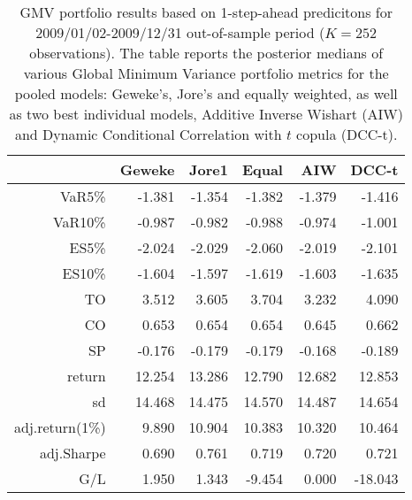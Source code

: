 \begin{table}[ht]
\centering
\caption{GMV portfolio results based on 1-step-ahead predicitons 
             for  2009/01/02-2009/12/31 out-of-sample period ($K=252$ observations).
             The table reports the posterior medians of various Global Minimum
             Variance portfolio metrics for the pooled models: 
             Geweke's, Jore's and equally weighted, 
             as well as two best individual models, Additive Inverse Wishart (AIW) and 
             Dynamic Conditional Correlation with $t$ copula (DCC-t).} 
\label{table:gmvfull4}
\begin{tabular}{rrrrrr}
  \hline
 & Geweke & Jore1 & Equal & AIW & DCC-t \\ 
  \hline
VaR5\% & -1.381 & -1.354 & -1.382 & -1.379 & -1.416 \\ 
  VaR10\% & -0.987 & -0.982 & -0.988 & -0.974 & -1.001 \\ 
  ES5\% & -2.024 & -2.029 & -2.060 & -2.019 & -2.101 \\ 
  ES10\% & -1.604 & -1.597 & -1.619 & -1.603 & -1.635 \\ 
  TO & 3.512 & 3.605 & 3.704 & 3.232 & 4.090 \\ 
  CO & 0.653 & 0.654 & 0.654 & 0.645 & 0.662 \\ 
  SP & -0.176 & -0.179 & -0.179 & -0.168 & -0.189 \\ 
   \hline
return & 12.254 & 13.286 & 12.790 & 12.682 & 12.853 \\ 
  sd & 14.468 & 14.475 & 14.570 & 14.487 & 14.654 \\ 
  adj.return(1\%) & 9.890 & 10.904 & 10.383 & 10.320 & 10.464 \\ 
  adj.Sharpe & 0.690 & 0.761 & 0.719 & 0.720 & 0.721 \\ 
  G/L & 1.950 & 1.343 & -9.454 & 0.000 & -18.043 \\ 
   \hline
\end{tabular}
\end{table}
